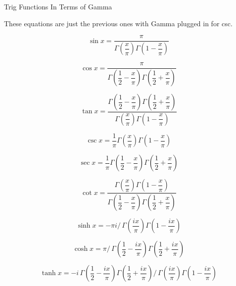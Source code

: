 \documentclass[12pt]{article}
\begin{document}
\pagebreak\begin{section}{Trig Functions In Terms of Gamma}

	\noindent These equations are just the previous ones with Gamma plugged in for csc.

	\begin{equation}\sin x=\dfrac\pi{\Gamma\left(\dfrac x\pi\right)\Gamma\left(1-\dfrac x\pi\right)}\end{equation}

	\begin{equation}
		\cos x=\dfrac\pi{\Gamma\left(\dfrac12-\dfrac x\pi\right)\Gamma\left(\dfrac12+\dfrac x\pi\right)}
	\end{equation}

	\begin{equation}
		\tan x=\dfrac{\Gamma\left(\dfrac12-\dfrac x\pi\right)\Gamma\left(\dfrac12+\dfrac x\pi\right)}
		{\Gamma\left(\dfrac x\pi\right)\Gamma\left(1-\dfrac x\pi\right)}
	\end{equation}
	
	\begin{equation}\csc x=\dfrac1\pi\Gamma\left(\dfrac x\pi\right)\Gamma\left(1-\dfrac x\pi\right)\end{equation}

	\begin{equation}
		\sec x=\dfrac1\pi\Gamma\left(\dfrac12-\dfrac x\pi\right)\Gamma\left(\dfrac12+\dfrac x\pi\right)
	\end{equation}

	\begin{equation}
		\cot x=\dfrac{\Gamma\left(\dfrac x\pi\right)\Gamma\left(1-\dfrac x\pi\right)}
		{\Gamma\left(\dfrac12-\dfrac x\pi\right)\Gamma\left(\dfrac12+\dfrac x\pi\right)}
	\end{equation}


	\begin{equation}\sinh x=-\pi i\big/\,\Gamma\left(\dfrac{ix}\pi\right)\Gamma\left(1-\dfrac{ix}\pi\right)\end{equation}

	\begin{equation}
		\cosh x=\pi\big/\,\Gamma\left(\dfrac12-\dfrac{ix}\pi\right)\Gamma\left(\dfrac12+\dfrac{ix}\pi\right)
	\end{equation}

	\begin{equation}
		\tanh x=-i\,\Gamma\left(\dfrac12-\dfrac{ix}\pi\right)\Gamma\left(\dfrac12+\dfrac{ix}\pi\right)\big/\,\Gamma\left(\dfrac{ix}\pi\right)\Gamma\left(1-\dfrac{ix}\pi\right)
	\end{equation}


\end{section}
\end{document}

